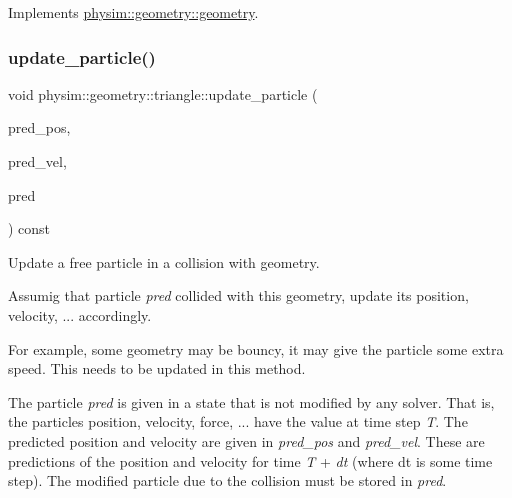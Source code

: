 Implements \hyperlink{classphysim_1_1geometry_1_1geometry_a45bffd27f5e8d59375762cf7987625e1}{physim\+::geometry\+::geometry}.

\mbox{\label{classphysim_1_1geometry_1_1triangle_a85898a3cca36efa410dfe9044619c798}} 
\subsubsection{\texorpdfstring{update\+\_\+particle()}{update\_particle()}\hspace{0.1cm}{\footnotesize\ttfamily [1/2]}}
{\footnotesize\ttfamily void physim\+::geometry\+::triangle\+::update\+\_\+particle (\begin{DoxyParamCaption}\item[{const \hyperlink{structphysim_1_1math_1_1vec3}{math\+::vec3} \&}]{pred\+\_\+pos,  }\item[{const \hyperlink{structphysim_1_1math_1_1vec3}{math\+::vec3} \&}]{pred\+\_\+vel,  }\item[{\hyperlink{classphysim_1_1particles_1_1free__particle}{particles\+::free\+\_\+particle} $\ast$}]{pred }\end{DoxyParamCaption}) const\hspace{0.3cm}{\ttfamily [virtual]}}



Update a free particle in a collision with geometry. 

Assumig that particle {\itshape pred} collided with this geometry, update its position, velocity, ... accordingly.

For example, some geometry may be \textquotesingle{}bouncy\textquotesingle{}, it may give the particle some extra speed. This needs to be updated in this method.

The particle {\itshape pred} is given in a state that is not modified by any solver. That is, the particle\textquotesingle{}s position, velocity, force, ... have the value at time step {\itshape T}. The predicted position and velocity are given in {\itshape pred\+\_\+pos} and {\itshape pred\+\_\+vel}. These are predictions of the position and velocity for time {\itshape T} + {\itshape dt} (where dt is some time step). The modified particle due to the collision must be stored in {\itshape pred}.


